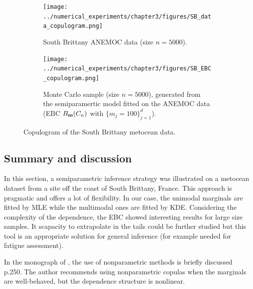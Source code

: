 \begin{landscape}
    \begin{figure}
        \begin{subfigure}[b]{0.49\linewidth}
            \centering
            \texttt{[image: ../numerical\_experiments/chapter3/figures/SB\_data\_copulogram.png]}
            \vspace*{2pt}
            \caption{South Brittany ANEMOC data (size $n=5000$).}
        \end{subfigure}
        \begin{subfigure}[b]{0.49\linewidth}
            \centering
            \texttt{[image: ../numerical\_experiments/chapter3/figures/SB\_EBC\_copulogram.png]}
            \caption{Monte Carlo sample (size $n=5000$), generated from the semiparamertic model fitted on the ANEMOC data (EBC $B_{{\bf m}}(C_n)$ with $ \{m_j=100\}_{j=1}^d$).}
        \end{subfigure}
        \vspace*{5pt} 
        \caption{Copulogram of the South Brittany metocean data.}
        \label{fig:sb_copulograms}
    \end{figure}
\end{landscape}




\subsection{Summary and discussion}

In this section, a semiparametric inference strategy was illustrated on a metocean dataset from a site off the coast of South Brittany, France. 
This approach is pragmatic and offers a lot of flexibility. 
In our case, the unimodal marginals are fitted by MLE while the multimodal ones are fitted by KDE. 
Considering the complexity of the dependence, the EBC showed interesting results for large size samples. 
It scapacity to extrapolate in the tails could be further studied \citep{heredia_2022_nonparam_copula} but this tool is an appropriate solution for general inference (for example needed for fatigue assessment). 

In the monograph of \citet{joe2011dependence}, the use of nonparametric methods is briefly discussed p.250. 
The author recommends using nonparametric copulas when the marginals are well-behaved, but the dependence structure is nonlinear. 


